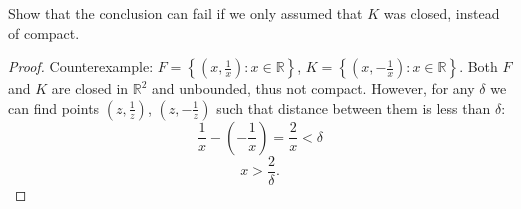 \documentclass{article}
\begin{document}
\begin{tcolorbox}
 Show that the conclusion can fail if we only assumed that $K$ was closed, instead of compact.
\end{tcolorbox}
\begin{proof}
Counterexample: $F = \left\{ \left(x,\frac{1}{x}\right) : x\in\mathbb{R} \right\}$, $K = \left\{ \left(x,-\frac{1}{x}\right) : x\in\mathbb{R} \right\}$. Both $F$ and $K$ are closed in $\mathbb{R}^2$ and unbounded, thus not compact. However, for any $\delta$ we can find points $\left( z, \frac{1}{z} \right)$, $\left( z, -\frac{1}{z} \right)$ such that distance between them is less than $\delta$:
$$ \frac{1}{x} - \left( - \frac{1}{x} \right) = \frac{2}{x} < \delta $$
$$ x > \frac{2}{\delta}. $$
\end{proof}
\end{document}
